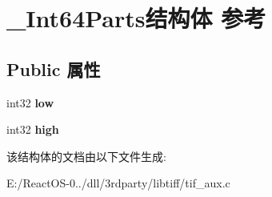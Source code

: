 \hypertarget{struct___int64_parts}{}\section{\+\_\+\+Int64\+Parts结构体 参考}
\label{struct___int64_parts}
\subsection*{Public 属性}
\begin{DoxyCompactItemize}
\item 
\mbox{\label{struct___int64_parts_a2c68889f5ccb604770acbe7c0fd63314}} 
int32 {\bfseries low}
\item 
\mbox{\label{struct___int64_parts_a798c71deaf65650ca00228557be725d4}} 
int32 {\bfseries high}
\end{DoxyCompactItemize}


该结构体的文档由以下文件生成\+:\begin{DoxyCompactItemize}
\item 
E\+:/\+React\+O\+S-\/0../dll/3rdparty/libtiff/tif\+\_\+aux.\+c\end{DoxyCompactItemize}
